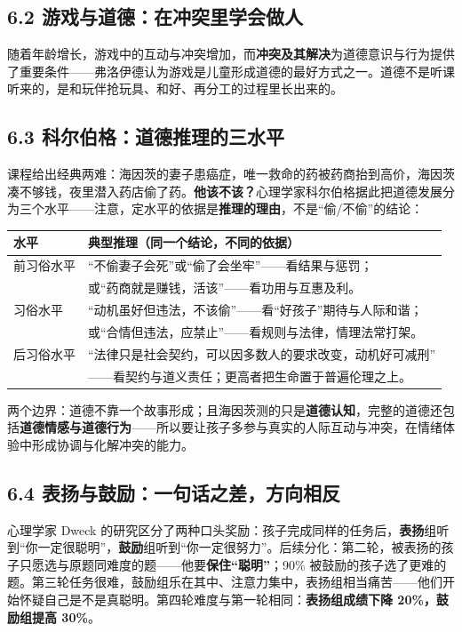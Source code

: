 \documentclass[UTF8,a4paper,11pt]{ctexart}
\begin{document}
\subsection*{6.2 游戏与道德：在冲突里学会做人}

随着年龄增长，游戏中的互动与冲突增加，而\textbf{冲突及其解决}为道德意识与行为提供了重要条件——弗洛伊德认为游戏是儿童形成道德的最好方式之一。道德不是听课听来的，是和玩伴抢玩具、和好、再分工的过程里长出来的。

\subsection*{6.3 科尔伯格：道德推理的三水平}

课程给出经典两难：海因茨的妻子患癌症，唯一救命的药被药商抬到高价，海因茨凑不够钱，夜里潜入药店偷了药。\textbf{他该不该？}心理学家科尔伯格据此把道德发展分为三个水平——注意，定水平的依据是\textbf{推理的理由}，不是“偷/不偷”的结论：

\begin{center}
\small
\begin{tabular}{@{}ll@{}}
\toprule
\textbf{水平} & \textbf{典型推理（同一个结论，不同的依据）} \\
\midrule
前习俗水平 & “不偷妻子会死”或“偷了会坐牢”——看结果与惩罚； \\
            & 或“药商就是赚钱，活该”——看功用与互惠及利。 \\
习俗水平 & “动机虽好但违法，不该偷”——看“好孩子”期待与人际和谐； \\
            & 或“合情但违法，应禁止”——看规则与法律，情理法常打架。 \\
后习俗水平 & “法律只是社会契约，可以因多数人的要求改变，动机好可减刑” \\
            & ——看契约与道义责任；更高者把生命置于普遍伦理之上。 \\
\bottomrule
\end{tabular}
\end{center}

两个边界：道德不靠一个故事形成；且海因茨测的只是\textbf{道德认知}，完整的道德还包括\textbf{道德情感与道德行为}——所以要让孩子多参与真实的人际互动与冲突，在情绪体验中形成协调与化解冲突的能力。

\subsection*{6.4 表扬与鼓励：一句话之差，方向相反}

心理学家 Dweck 的研究区分了两种口头奖励：孩子完成同样的任务后，\textbf{表扬}组听到“你一定很聪明”，\textbf{鼓励}组听到“你一定很努力”。后续分化：第二轮，被表扬的孩子只愿选与原题同难度的题——他要\textbf{保住“聪明”}；90\% 被鼓励的孩子选了更难的题。第三轮任务很难，鼓励组乐在其中、注意力集中，表扬组相当痛苦——他们开始怀疑自己是不是真聪明。第四轮难度与第一轮相同：\textbf{表扬组成绩下降 20\%，鼓励组提高 30\%}。
\end{document}
